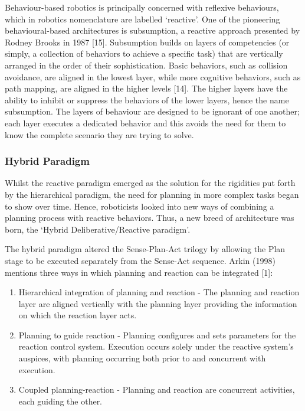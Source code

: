 \documentclass{article}
\begin{document}
Behaviour-based robotics is principally concerned with reflexive behaviours, which in robotics nomenclature are labelled ‘reactive’. One of the pioneering behavioural-based architectures is subsumption, a reactive approach presented by Rodney Brooks in 1987 [15]. Subsumption builds on layers of competencies (or simply, a collection of behaviors to achieve a specific task) that are vertically arranged in the order of their sophistication. Basic behaviors, such as collision avoidance, are aligned in the lowest layer, while more cognitive behaviors, such as path mapping, are aligned in the higher levels [14]. The higher layers have the ability to inhibit or suppress the behaviors of the lower layers, hence the name subsumption. The layers of behaviour are designed to be ignorant of one another; each layer executes a dedicated behavior and this avoids the need for them to know the complete scenario they are trying to solve.

	\subsubsection{Hybrid Paradigm}
	Whilst the reactive paradigm emerged as the solution for the rigidities put forth by the hierarchical paradigm, the need for planning in more complex tasks began to show over time. Hence, roboticists looked into new ways of combining a planning process with reactive behaviors. Thus, a new breed of architecture was born, the ‘Hybrid Deliberative/Reactive paradigm’. 

The hybrid paradigm altered the Sense-Plan-Act trilogy by allowing the Plan stage to be executed separately from the Sense-Act sequence. Arkin (1998) mentions three ways in which planning and reaction can be integrated [1]:
\begin{enumerate}
\item Hierarchical integration of planning and reaction - The planning and reaction layer are aligned vertically with the planning layer providing the information on which the reaction layer acts.

\item Planning to guide reaction - Planning configures and sets parameters for the reaction control system. Execution occurs solely under the reactive system's auspices, with planning occurring both prior to and concurrent with execution.

\item Coupled planning-reaction - Planning and reaction are concurrent activities, each guiding the other.
\end{enumerate}
\end{document}
